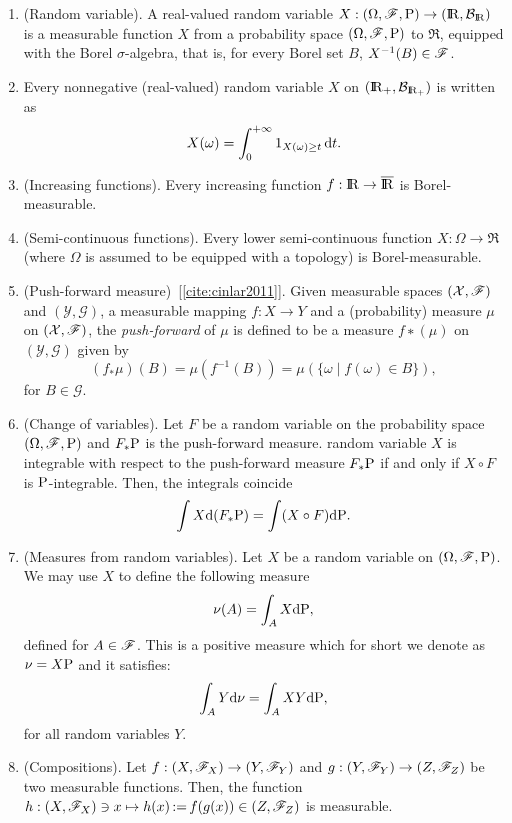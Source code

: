 \documentclass[a4paper,10pt]{scrbook}
\begin{document}
\begin{enumerate}
       
 \item \label{rv220000}
       (Random variable).
       A real-valued random variable $X:\ofp \to (\Re, \B_\Re)$ is a measurable function $X$
       from a probability space $(\Omega,\mathscr{F},\mathrm{P})$ to $\Re$, equipped with the Borel $\sigma$-algebra, that is, 
       for every Borel set $B$, $X^{-1}(B)\in\mathscr{F}$.              
       
 \item \label{rv221030}
      Every nonnegative (real-valued) random variable $X$ on $(\Re_+, \B_{{\Re}_+})$ 
      is written as 
      \[
        X(\omega) = \int_0^{+\infty} 1_{X(\omega)\geq t}\,\mathrm{d} t.
      \]

 \item (Increasing functions).  Every increasing function $f:\Re\to\barre$ is Borel-measurable.
 
 \item (Semi-continuous functions). Every lower semi-continuous function $X:\Omega\to\Re$ (where $\Omega$ is assumed 
       to be equipped with a topology) is Borel-measurable. 
       
 \item (Push-forward measure)~[\ref{cite:cinlar2011}]. Given measurable spaces $(\mathcal{X},\mathscr{F})$ and $(\mathcal{Y}, \mathcal{G})$, 
 a measurable mapping $f: X \to Y$ and a (probability) measure $\mu$ on $(\mathcal{X},\mathscr{F})$, the \textit{push-forward} of $\mu$
 is defined to be a measure $f∗(\mu)$ on $(\mathcal{Y}, \mathcal{G})$ given by
 \[
  (f_*\mu)(B) = \mu(f^{-1}(B)) = \mu(\{\omega\mid f(\omega)\in B\}),
 \]
 for $B\in\mathcal{G}$.
 \item (Change of variables). Let $F$ be a random variable on the probability space $(\Omega,\mathscr{F},\mathrm{P})$ and $F_*\mathrm{P}$ 
 is the push-forward measure. random variable $X$ is integrable with respect to the push-forward measure $F_*\mathrm{P}$
 if and only if $X\circ F$ is $\mathrm{P}$-integrable. Then, the integrals coincide
 \[
  \int X \mathrm{d}(F_*\mathrm{P}) = \int (X\circ F) \mathrm{d} \mathrm{P}.
 \]
 \item (Measures from random variables). Let $X$ be a random variable on $(\Omega,\mathscr{F},\mathrm{P})$. 
       We may use $X$ to define the following measure
       \[
        \nu(A) = \int_A X\mathrm{d} \mathrm{P},
       \]
       defined for $A\in\mathscr{F}$. This is a positive measure which for short we denote as $\nu=X\mathrm{P}$
       and it satisfies:
       \[
        \int_A Y\mathrm{d} \nu = \int_A XY\mathrm{d} \mathrm{P},
       \]
       for all random variables $Y$.
       
 \item (Compositions). Let $f:(X,\mathscr{F}_X)\to (Y, \mathscr{F}_Y)$ and $g:(Y,\mathscr{F}_Y)\to (Z,\mathscr{F}_Z)$ be two measurable functions. 
       Then, the function $h:(X,\mathscr{F}_X)\ni x\mapsto h(x) {}\mathop{\mathrel{:}=}{} f(g(x)) \in (Z,\mathscr{F}_Z)$ is measurable. 
       

\end{enumerate}
\end{document}
